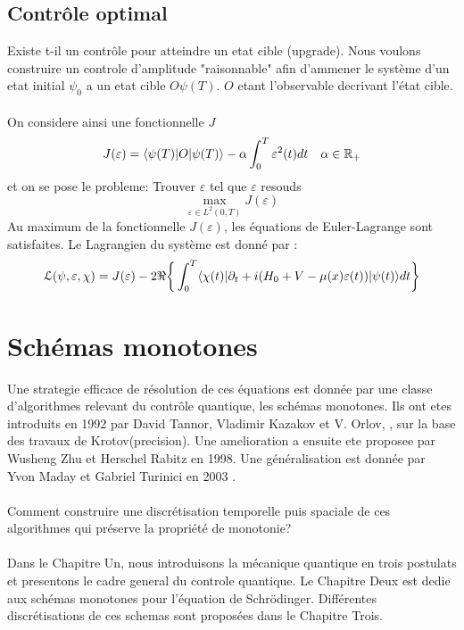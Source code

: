 \subsection*{Contrôle optimal}
Existe t-il un contrôle pour atteindre un etat cible (upgrade).
Nous voulons construire un controle d'amplitude "raisonnable" afin d'ammener le système d'un etat initial $\psi_0$ a un etat cible $O\psi(T)$. $O$ etant l'observable decrivant l'état cible.\\\\
On considere ainsi une fonctionnelle $J$
\begin{equation}
J(\varepsilon) = \langle \psi(T)|O|\psi(T) \rangle - \alpha \int_{0}^{T}\varepsilon^2(t)dt \quad \alpha \in \mathbb R_+
\end{equation}
et on se pose le probleme: Trouver $\varepsilon$ tel que $\varepsilon$ resouds
$$ \max_{\varepsilon \in L^2(0,T)} J(\varepsilon)$$
Au maximum de la fonctionnelle $J(\varepsilon)$, les équations de Euler-Lagrange sont satisfaites. Le Lagrangien du système est donné par :
\begin{equation} \label{lagrangien}
\mathcal{L}(\psi,\varepsilon,\chi)= J(\varepsilon)\\
-2\Re \bigg\{ \int_{0}^{T}\langle \chi (t)|\partial_{t}+i(H_0+V-\mu(x)\varepsilon(t))|\psi(t) \rangle dt \bigg\}
\end{equation}
\section*{Schémas monotones}
Une strategie efficace de résolution de ces équations est donnée par une classe d’algorithmes relevant du contrôle quantique, les schémas monotones. Ils ont etes introduits en 1992 par David Tannor, Vladimir Kazakov et V. Orlov,  \cite{Tannor}, sur la base des travaux de Krotov(precision). Une amelioration a ensuite ete proposee par Wusheng Zhu et Herschel Rabitz \cite{Zhu} en 1998. Une généralisation est donnée par Yvon Maday et Gabriel Turinici en 2003 \cite{Maday}.\\\\

Comment construire une discrétisation temporelle puis spaciale de ces algorithmes qui préserve la propriété de monotonie?\\\\

Dans le Chapitre Un, nous introduisons la mécanique quantique en trois postulats et presentons le cadre general du controle quantique. Le Chapitre Deux est dedie aux schémas monotones pour l'équation de Schrödinger.
Différentes discrétisations de ces schemas sont proposées dans le Chapitre Trois.